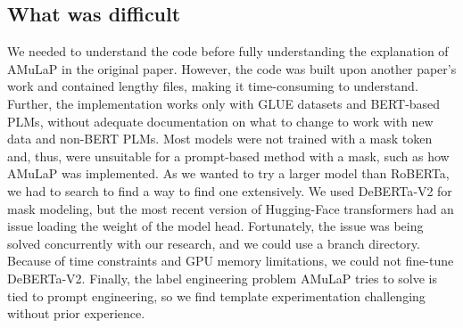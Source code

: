 \subsection{What was difficult}

We needed to understand the code before fully understanding the explanation of AMuLaP in the original paper. However, the code was built upon another paper's work and contained lengthy files, making it time-consuming to understand. Further, the implementation works only with GLUE datasets and BERT-based PLMs, without adequate documentation on what to change to work with new data and non-BERT PLMs. Most models were not trained with a mask token and, thus, were unsuitable for a prompt-based method with a mask, such as how AMuLaP was implemented. As we wanted to try a larger model than RoBERTa, we had to search to find a way to find one extensively. We used DeBERTa‐V2 for mask modeling, but the most recent version of Hugging-Face transformers had an issue loading the weight of the model head. Fortunately, the issue was being solved concurrently with our research, and we could use a branch directory. Because of time constraints and GPU memory limitations, we could not fine-tune DeBERTa-V2. Finally, the label engineering problem AMuLaP tries to solve is tied to prompt engineering, so we find template experimentation challenging without prior experience.  



